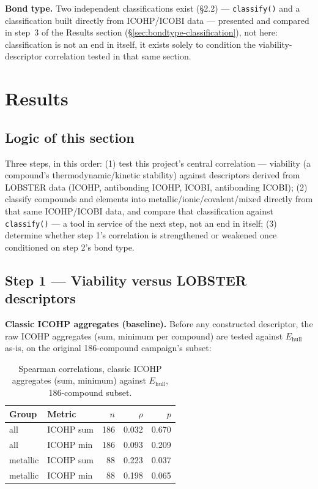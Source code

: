 \documentclass[11pt,a4paper]{article}
\begin{document}
\textbf{Bond type.} Two independent classifications exist (\S2.2) --- \texttt{classify()} and a classification built directly from ICOHP/ICOBI data --- presented and compared in step~3 of the Results section (\S\ref{sec:bondtype-classification}), not here: classification is not an end in itself, it exists solely to condition the viability-descriptor correlation tested in that same section.

\section{Results}
\label{sec:results}

\subsection*{Logic of this section}

Three steps, in this order: (1) test this project's central correlation
--- viability (a compound's thermodynamic/kinetic stability) against
descriptors derived from LOBSTER data (ICOHP, antibonding ICOHP, ICOBI,
antibonding ICOBI); (2) classify compounds and elements into
metallic/ionic/covalent/mixed directly from that same ICOHP/ICOBI data,
and compare that classification against \texttt{classify()} --- a tool
in service of the next step, not an end in itself; (3) determine whether
step 1's correlation is strengthened or weakened once conditioned on
step 2's bond type.

\subsection{Step 1 --- Viability versus LOBSTER descriptors}
\label{sec:reframing}

\textbf{Classic ICOHP aggregates (baseline).} Before any constructed
descriptor, the raw ICOHP aggregates (sum, minimum per compound) are
tested against $E_\text{hull}$ as-is, on the original 186-compound
campaign's subset:

\begin{table}[htbp]
\centering
\caption{Spearman correlations, classic ICOHP aggregates (sum, minimum) against $E_\text{hull}$, 186-compound subset.}
\label{tab:classic-icohp}
\small
\begin{tabular}{@{}llrrr@{}}
\toprule
Group & Metric & $n$ & $\rho$ & $p$ \\
\midrule
all & ICOHP sum    & 186 & 0.032 & 0.670 \\
all & ICOHP min    & 186 & 0.093 & 0.209 \\
metallic & ICOHP sum  & 88 & 0.223 & 0.037 \\
metallic & ICOHP min  & 88 & 0.198 & 0.065 \\
\bottomrule
\end{tabular}
\end{table}
\end{document}

